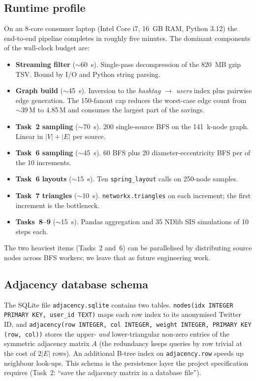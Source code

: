 \documentclass[conference]{IEEEtran}
\begin{document}
\subsection{Runtime profile}
\label{app:runtime}
On an 8-core consumer laptop (Intel Core i7, 16~GB RAM,
Python 3.12) the end-to-end pipeline completes in roughly
five minutes.  The dominant components of the wall-clock
budget are:
\begin{itemize}
  \item \textbf{Streaming filter} ($\sim$60~s).  Single-pass
        decompression of the 820~MB gzip TSV.  Bound by I/O
        and Python string parsing.
  \item \textbf{Graph build} ($\sim$45~s).  Inversion to the
        \textit{hashtag $\to$ users} index plus pairwise
        edge generation.  The 150-fanout cap reduces the
        worst-case edge count from $\sim$39\,M to 4.85\,M and
        consumes the largest part of the savings.
  \item \textbf{Task~2 sampling} ($\sim$70~s).  200
        single-source BFS on the 141~k-node graph.  Linear in
        $|V|+|E|$ per source.
  \item \textbf{Task~6 sampling} ($\sim$45~s).  60 BFS plus
        20 diameter-eccentricity BFS per of the 10
        increments.
  \item \textbf{Task~6 layouts} ($\sim$15~s).  Ten
        \texttt{spring\_layout} calls on 250-node samples.
  \item \textbf{Task~7 triangles} ($\sim$10~s).
        \texttt{networkx.triangles} on each increment; the
        first increment is the bottleneck.
  \item \textbf{Tasks~8--9} ($\sim$15~s).  Pandas aggregation
        and 35 NDlib SIS simulations of 10 steps each.
\end{itemize}
The two heaviest items (Tasks~2 and~6) can be parallelised by
distributing source nodes across BFS workers; we leave that
as future engineering work.

\subsection{Adjacency database schema}
\label{app:db}
The SQLite file \texttt{adjacency.sqlite} contains two
tables.  \texttt{nodes(idx INTEGER PRIMARY KEY, user\_id
TEXT)} maps each row index to its anonymised Twitter ID, and
\texttt{adjacency(row INTEGER, col INTEGER, weight INTEGER,
PRIMARY KEY (row, col))} stores the upper- \emph{and}
lower-triangular non-zero entries of the symmetric adjacency
matrix $A$ (the redundancy keeps queries by row trivial at
the cost of $2|E|$ rows).  An additional B-tree index on
\texttt{adjacency.row} speeds up neighbour look-ups.  This
schema is the persistence layer the project specification
requires (Task~2: ``save the adjacency matrix in a database
file'').
\end{document}
